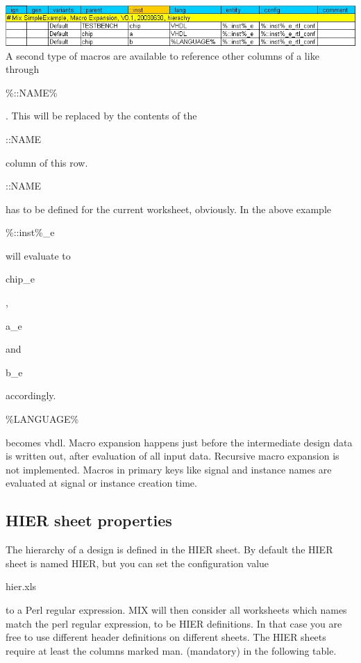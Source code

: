 \documentclass[a4paper,12pt]{article}
\begin{document}
\includegraphics[scale=0.6]{images/mix_table0.jpg}\\
A second type of macros are available to reference other columns of a like through \begin{tt}\%::NAME\%\end{tt}. This will be replaced by the contents of the \begin{tt}::NAME\end{tt} column of this row. \begin{tt}::NAME\end{tt} has to be defined for the current worksheet, obviously. In the above example \begin{tt}\%::inst\%\_e\end{tt} will evaluate to \begin{tt}chip\_e\end{tt}, \begin{tt}a\_e\end{tt} and \begin{tt}b\_e\end{tt} accordingly. \begin{tt}\%LANGUAGE\%\end{tt} becomes vhdl. Macro expansion happens just before the intermediate design data is written out, after evaluation of all input data. Recursive macro expansion is not implemented. Macros in primary keys like signal and instance names are evaluated at signal or instance creation time.

\subsection{HIER sheet properties}
The hierarchy of a design is defined in the HIER sheet. By default the HIER sheet is named HIER, but you can set the configuration value \begin{bf}hier.xls\end{bf} to a Perl regular expression. MIX will then consider all worksheets which names match the perl regular expression, to be HIER definitions. In that case you are free to use different header definitions on different sheets.\newline
The HIER sheets require at least the columns marked man. (mandatory) in the following table.
\end{document}
